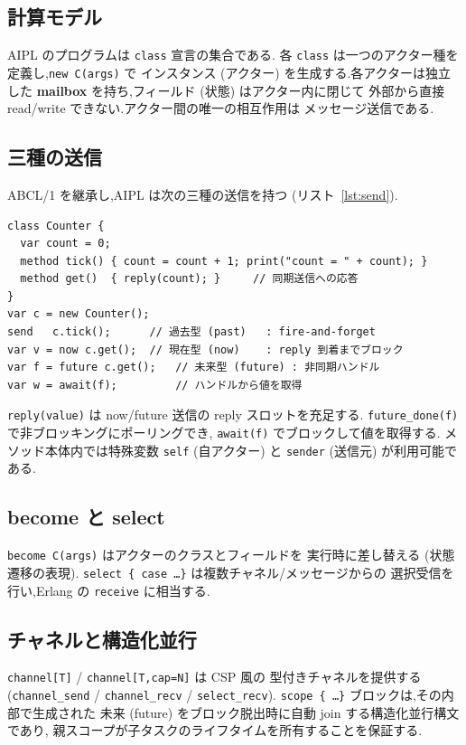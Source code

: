 \documentclass[11pt,a4paper]{article}
\newcommand{\code}[1]{\texttt{\small #1}}
\begin{document}
\subsection{計算モデル}
AIPL のプログラムは \code{class} 宣言の集合である.
各 \code{class} は一つのアクター種を定義し,\code{new C(args)} で
インスタンス (アクター) を生成する.各アクターは独立した
\textbf{mailbox} を持ち,フィールド (状態) はアクター内に閉じて
外部から直接 read/write できない.アクター間の唯一の相互作用は
メッセージ送信である.

\subsection{三種の送信}
ABCL/1 を継承し,AIPL は次の三種の送信を持つ
(リスト~\ref{lst:send}).

\begin{lstlisting}[caption={三種送信と reply},label={lst:send},float=h]
class Counter {
  var count = 0;
  method tick() { count = count + 1; print("count = " + count); }
  method get()  { reply(count); }     // 同期送信への応答
}
var c = new Counter();
send   c.tick();      // 過去型 (past)   : fire-and-forget
var v = now c.get();  // 現在型 (now)    : reply 到着までブロック
var f = future c.get();   // 未来型 (future) : 非同期ハンドル
var w = await(f);         // ハンドルから値を取得
\end{lstlisting}

\code{reply(value)} は now/future 送信の reply スロットを充足する.
\code{future\_done(f)} で非ブロッキングにポーリングでき,
\code{await(f)} でブロックして値を取得する.
メソッド本体内では特殊変数 \code{self} (自アクター) と
\code{sender} (送信元) が利用可能である.

\subsection{become と select}
\code{become C(args)} はアクターのクラスとフィールドを
実行時に差し替える (状態遷移の表現).
\code{select \{ case \dots \}} は複数チャネル/メッセージからの
選択受信を行い,Erlang の \code{receive} に相当する.

\subsection{チャネルと構造化並行}
\code{channel[T]} / \code{channel[T,cap=N]} は CSP 風の
型付きチャネルを提供する (\code{channel\_send} / \code{channel\_recv} /
\code{select\_recv}).
\code{scope \{ \dots \}} ブロックは,その内部で生成された
未来 (future) をブロック脱出時に自動 join する構造化並行構文であり,
親スコープが子タスクのライフタイムを所有することを保証する.
\end{document}

